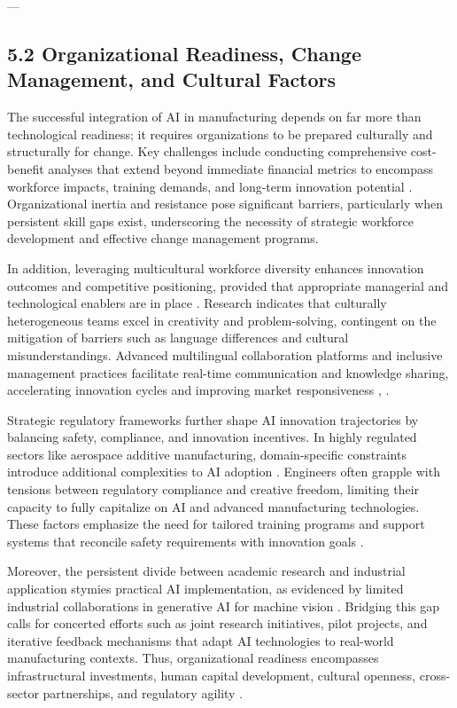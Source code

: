 \documentclass[11pt]{article}
\begin{document}
---

\subsection{5.2 Organizational Readiness, Change Management, and Cultural Factors}

The successful integration of AI in manufacturing depends on far more than technological readiness; it requires organizations to be prepared culturally and structurally for change. Key challenges include conducting comprehensive cost-benefit analyses that extend beyond immediate financial metrics to encompass workforce impacts, training demands, and long-term innovation potential \cite{ref3}. Organizational inertia and resistance pose significant barriers, particularly when persistent skill gaps exist, underscoring the necessity of strategic workforce development and effective change management programs.

In addition, leveraging multicultural workforce diversity enhances innovation outcomes and competitive positioning, provided that appropriate managerial and technological enablers are in place \cite{ref16}. Research indicates that culturally heterogeneous teams excel in creativity and problem-solving, contingent on the mitigation of barriers such as language differences and cultural misunderstandings. Advanced multilingual collaboration platforms and inclusive management practices facilitate real-time communication and knowledge sharing, accelerating innovation cycles and improving market responsiveness \cite{ref17}, \cite{ref19}.

Strategic regulatory frameworks further shape AI innovation trajectories by balancing safety, compliance, and innovation incentives. In highly regulated sectors like aerospace additive manufacturing, domain-specific constraints introduce additional complexities to AI adoption \cite{ref13}. Engineers often grapple with tensions between regulatory compliance and creative freedom, limiting their capacity to fully capitalize on AI and advanced manufacturing technologies. These factors emphasize the need for tailored training programs and support systems that reconcile safety requirements with innovation goals \cite{ref9}.

Moreover, the persistent divide between academic research and industrial application stymies practical AI implementation, as evidenced by limited industrial collaborations in generative AI for machine vision \cite{ref3}. Bridging this gap calls for concerted efforts such as joint research initiatives, pilot projects, and iterative feedback mechanisms that adapt AI technologies to real-world manufacturing contexts. Thus, organizational readiness encompasses infrastructural investments, human capital development, cultural openness, cross-sector partnerships, and regulatory agility \cite{ref36}.
\end{document}
